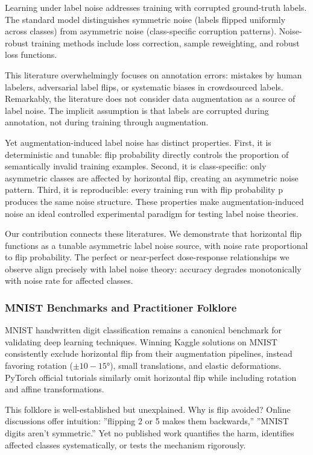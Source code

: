 Learning under label noise addresses training with corrupted ground-truth labels. The standard model distinguishes symmetric noise (labels flipped uniformly across classes) from asymmetric noise (class-specific corruption patterns). Noise-robust training methods include loss correction, sample reweighting, and robust loss functions.

This literature overwhelmingly focuses on annotation errors: mistakes by human labelers, adversarial label flips, or systematic biases in crowdsourced labels. Remarkably, the literature does not consider data augmentation as a source of label noise. The implicit assumption is that labels are corrupted during annotation, not during training through augmentation.

Yet augmentation-induced label noise has distinct properties. First, it is deterministic and tunable: flip probability directly controls the proportion of semantically invalid training examples. Second, it is class-specific: only asymmetric classes are affected by horizontal flip, creating an asymmetric noise pattern. Third, it is reproducible: every training run with flip probability p produces the same noise structure. These properties make augmentation-induced noise an ideal controlled experimental paradigm for testing label noise theories.

Our contribution connects these literatures. We demonstrate that horizontal flip functions as a tunable asymmetric label noise source, with noise rate proportional to flip probability. The perfect or near-perfect dose-response relationships we observe align precisely with label noise theory: accuracy degrades monotonically with noise rate for affected classes.

\subsubsection{MNIST Benchmarks and Practitioner Folklore}

MNIST handwritten digit classification remains a canonical benchmark for validating deep learning techniques. Winning Kaggle solutions on MNIST consistently exclude horizontal flip from their augmentation pipelines, instead favoring rotation ($\pm 10-15$°), small translations, and elastic deformations. PyTorch official tutorials similarly omit horizontal flip while including rotation and affine transformations.

This folklore is well-established but unexplained. Why is flip avoided? Online discussions offer intuition: ''flipping 2 or 5 makes them backwards,'' ''MNIST digits aren't symmetric.'' Yet no published work quantifies the harm, identifies affected classes systematically, or tests the mechanism rigorously.

